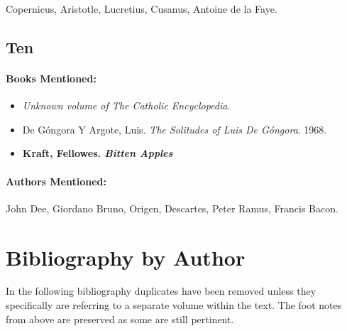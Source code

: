 \documentclass[12pt]{article}
\providecommand{\tightlist}{%
  \setlength{\itemsep}{0pt}\setlength{\parskip}{0pt}}
\begin{document}
Copernicus, Aristotle, Lucretius, Cusanus, Antoine de la Faye.

\subsection{Ten}\label{ten}

\paragraph{Books Mentioned:}\label{books-mentioned-24}

\begin{itemize}
\tightlist
\item
  \emph{Unknown volume of The Catholic Encyclopedia}.
\item
  De Góngora Y Argote, Luis. \emph{The Solitudes of Luis De Góngora}. 1968.
\item
  \textbf{Kraft, Fellowes. \emph{Bitten Apples}}
\end{itemize}

\paragraph{Authors Mentioned:}\label{authors-mentioned-18}

John Dee, Giordano Bruno, Origen, Descartes, Peter Ramus, Francis Bacon.

\section{Bibliography by Author}\label{bibliography-by-author}

In the following bibliography duplicates have been removed unless they specifically are referring to a separate volume within the text. The foot notes from above are preserved as some are still pertinent.
\end{document}
